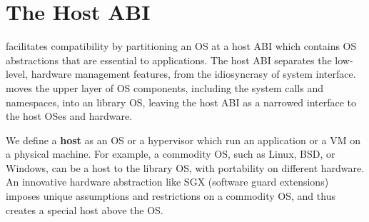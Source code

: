 \section{The Host ABI}
\label{sec:overview:host}

\graphene{} facilitates compatibility
by partitioning an OS
at a host ABI which contains
OS abstractions
that are essential to applications.
The host ABI separates the low-level, hardware management features, from the idiosyncrasy of system interface. 
\graphene{} moves the upper layer of OS components,
including the system calls and namespaces, into an library OS,
leaving the host ABI 
as a narrowed interface to the host OSes and hardware.






 
We define a {\bf host} as an OS or a hypervisor
which run an application or a VM
on a physical machine.
For example, a commodity OS, such as Linux, BSD, or Windows, can be a host to the library OS,
with portability on different hardware.
An innovative hardware abstraction like SGX (software guard extensions)
imposes unique assumptions and restrictions
on a commodity OS,
and thus creates a special host above the OS.




